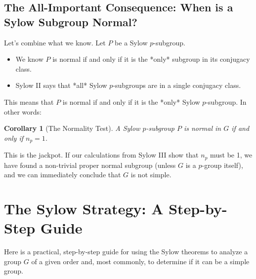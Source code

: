 \documentclass[12pt,a4paper]{article}
\theoremstyle{plain} %
\newtheorem{corollary}[theorem]{Corollary}
\theoremstyle{definition} %
\theoremstyle{remark} %
\begin{document}
\subsection{The All-Important Consequence: When is a Sylow Subgroup Normal?}

Let's combine what we know. Let $P$ be a Sylow $p$-subgroup.
\begin{itemize}
    \item We know $P$ is normal if and only if it is the *only* subgroup in its conjugacy class.
    \item Sylow II says that *all* Sylow $p$-subgroups are in a single conjugacy class.
\end{itemize}
This means that $P$ is normal if and only if it is the *only* Sylow $p$-subgroup. In other words:

\begin{corollary}[The Normality Test]
A Sylow $p$-subgroup $P$ is normal in $G$ if and only if $n_p = 1$.
\end{corollary}

This is the jackpot. If our calculations from Sylow III show that $n_p$ must be 1, we have found a non-trivial proper normal subgroup (unless $G$ is a $p$-group itself), and we can immediately conclude that $G$ is not simple.

\newpage
\section{The Sylow Strategy: A Step-by-Step Guide}

Here is a practical, step-by-step guide for using the Sylow theorems to analyze a group $G$ of a given order and, most commonly, to determine if it can be a simple group.
\end{document}
